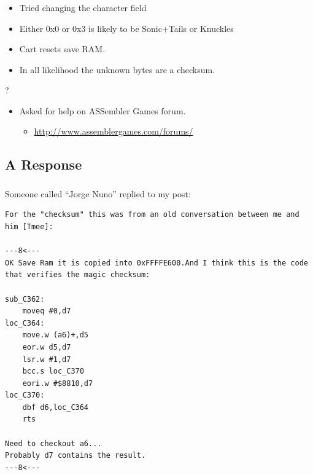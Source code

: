 \documentclass{beamer}
\begin{document}

\begin{frame}[fragile]
\frametitle{\insertsubsection}

\begin{itemize}
\item Tried changing the character field
\item Either 0x0 or 0x3 is likely to be Sonic+Tails or Knuckles
\item Cart resets save RAM.
\item In all likelihood the unknown bytes are a checksum.
\end{itemize}

\vfill

\begin{center}
{\Huge ?}
\end{center}

\pause

\vfill

\begin{itemize}
\item Asked for help on ASSembler Games forum.
\begin{itemize}
\item \url{http://www.assemblergames.com/forums/}
\end{itemize}
\end{itemize}

\vfill

\end{frame}


\subsection{A Response}




\begin{frame}[fragile]
\frametitle{\insertsubsection}

Someone called ``Jorge Nuno'' replied to my post:
\vfill


\begin{lstlisting}[basicstyle={\tt\tiny}]
For the "checksum" this was from an old conversation between me and him [Tmee]:

---8<---
OK Save Ram it is copied into 0xFFFFE600.And I think this is the code that verifies the magic checksum:

sub_C362:
    moveq #0,d7
loc_C364:
    move.w (a6)+,d5
    eor.w d5,d7
    lsr.w #1,d7
    bcc.s loc_C370
    eori.w #$8810,d7
loc_C370:
    dbf d6,loc_C364
    rts

Need to checkout a6...
Probably d7 contains the result. 
---8<---
\end{lstlisting}

\end{frame}

\end{document}
